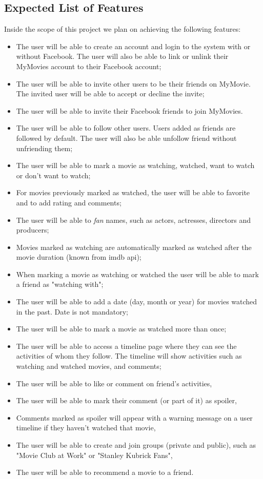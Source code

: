 \subsection{Expected List of Features}

Inside the scope of this project we plan on achieving the following features:

\begin{itemize}
  \item The user will be able to create an account and login to the system with
    or without Facebook. The user will also be able to link or unlink their
    MyMovies account to their Facebook account;
  \item The user will be able to invite other users to be their friends on
    MyMovie. The invited user will be able to accept or decline the invite;
  \item The user will be able to invite their Facebook friends to join
    MyMovies.
  \item The user will be able to follow other users. Users added as friends are
    followed by default. The user will also be able unfollow friend without
    unfriending them;
  \item The user will be able to mark a movie as watching,
    watched, want to watch or don't want to watch;
  \item For movies previously marked as watched, the user will be able to
    favorite and to add rating and comments;
  \item The user will be able to \textit{fan} names, such as actors, actresses,
    directors and producers;
  \item Movies marked as watching are automatically marked as watched after the
    movie duration (known from imdb api);
  \item When marking a movie as watching or watched the user will be able to
    mark a friend as "watching with";
  \item The user will be able to add a date (day, month or year) for movies
    watched in the past. Date is not mandatory;
  \item The user will be able to mark a movie as watched more than once;
  \item The user will be able to access a timeline page where they can see the
    activities of whom they follow. The timeline will show activities such as
    watching and watched movies, and comments;
  \item The user will be able to like or comment on friend's activities,
  \item The user will be able to mark their comment (or part of it) as spoiler,
  \item Comments marked as spoiler will appear with a warning message on a user
    timeline if they haven't watched that movie,
  \item The user will be able to create and join groups (private and public),
    such as "Movie Club at Work" or "Stanley Kubrick Fans",
  \item The user will be able to recommend a movie to a friend.
\end{itemize}


